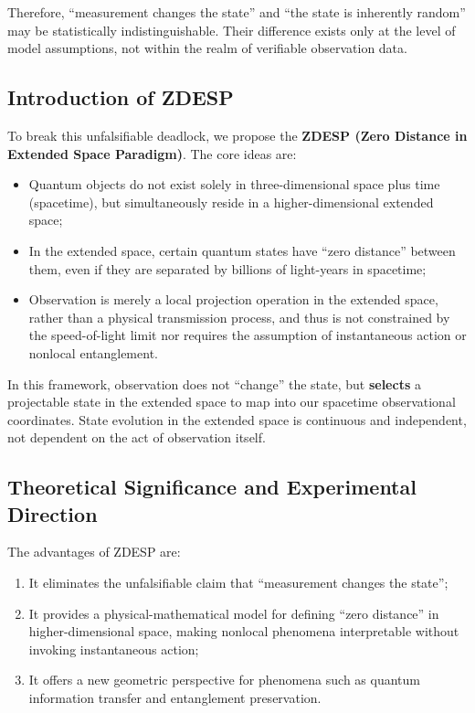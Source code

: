 \documentclass[12pt,a4paper]{article}
\begin{document}
	Therefore, “measurement changes the state” and “the state is inherently random” may be statistically indistinguishable. Their difference exists only at the level of model assumptions, not within the realm of verifiable observation data.
	
	\subsection{Introduction of ZDESP}
	To break this unfalsifiable deadlock, we propose the \textbf{ZDESP (Zero Distance in Extended Space Paradigm)}. The core ideas are:
	\begin{itemize}
		\item Quantum objects do not exist solely in three-dimensional space plus time (spacetime), but simultaneously reside in a higher-dimensional extended space;
		\item In the extended space, certain quantum states have ``zero distance'' between them, even if they are separated by billions of light-years in spacetime;
		\item Observation is merely a local projection operation in the extended space, rather than a physical transmission process, and thus is not constrained by the speed-of-light limit nor requires the assumption of instantaneous action or nonlocal entanglement.
	\end{itemize}
	
	In this framework, observation does not “change” the state, but \textbf{selects} a projectable state in the extended space to map into our spacetime observational coordinates. State evolution in the extended space is continuous and independent, not dependent on the act of observation itself.
	
	\subsection{Theoretical Significance and Experimental Direction}
	The advantages of ZDESP are:
	\begin{enumerate}
		\item It eliminates the unfalsifiable claim that “measurement changes the state”;
		\item It provides a physical-mathematical model for defining “zero distance” in higher-dimensional space, making nonlocal phenomena interpretable without invoking instantaneous action;
		\item It offers a new geometric perspective for phenomena such as quantum information transfer and entanglement preservation.
	\end{enumerate}
	
\end{document}
